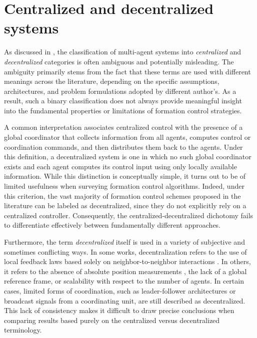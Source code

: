 \section{Centralized and decentralized systems} \label{sec.2:Centralized and decentralized systems}

As discussed in \cite{Oh2015}, the classification of multi-agent systems into \emph{centralized} and \emph{decentralized} categories is often ambiguous and potentially misleading. The ambiguity primarily stems from the fact that these terms are used with different meanings across the literature, depending on the specific assumptions, architectures, and problem formulations adopted by different author's. As a result, such a binary classification does not always provide meaningful insight into the fundamental properties or limitations of formation control strategies.

A common interpretation associates centralized control with the presence of a global coordinator that collects information from all agents, computes control or coordination commands, and then distributes them back to the agents. Under this definition, a decentralized system is one in which no such global coordinator exists and each agent computes its control input using only locally available information. While this distinction is conceptually simple, it turns out to be of limited usefulness when surveying formation control algorithms. Indeed, under this criterion, the vast majority of formation control schemes proposed in the literature can be labeled as decentralized, since they do not explicitly rely on a centralized controller. Consequently, the centralized-decentralized dichotomy fails to differentiate effectively between fundamentally different approaches.

Furthermore, the term \emph{decentralized} itself is used in a variety of subjective and sometimes conflicting ways. In some works, decentralization refers to the use of local feedback laws based solely on neighbor-to-neighbor interactions \cite{Lin2004}. In others, it refers to the absence of absolute position measurements \cite{Kim2007}, the lack of a global reference frame, or scalability with respect to the number of agents. In certain cases, limited forms of coordination, such as leader-follower architectures or broadcast signals from a coordinating unit, are still described as decentralized. This lack of consistency makes it difficult to draw precise conclusions when comparing results based purely on the centralized versus decentralized terminology.

